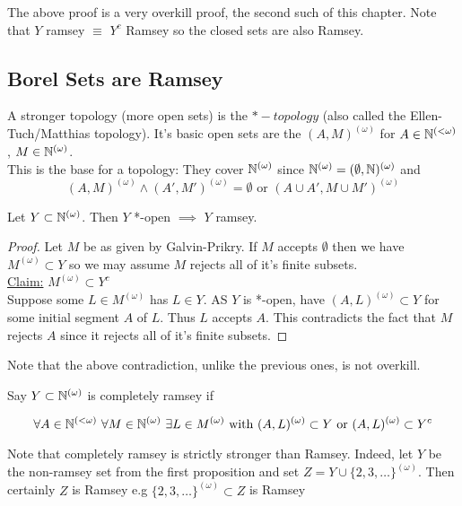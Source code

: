 \documentclass[a4paper]{article}
\newcommand{\Nomega}{\N^{(\omega)}}
\newcommand{\Momega}{M^{(\omega)}}
\newcommand{\Nfinite}{\N^{(< \omega)}}
\begin{document}
  The above proof is a very overkill proof, the second such of this chapter.
  Note that $Y$ ramsey $\equiv$ $Y^c$ Ramsey so the closed sets are also Ramsey.
  \subsection{Borel Sets are Ramsey}
  A stronger topology (more open sets) is the $*-topology$ (also called the
  Ellen-Tuch/Matthias topology). It's basic open sets are the $(A,
  M)^{(\omega)}$ for $A \in \Nfinite$, $M \in \Nomega$.\\
  This is the base for a topology: They cover $\Nomega$ since $\Nomega =
  (\emptyset, \N)^{(\omega)}$ and
  \[(A, M)^{(\omega)} \wedge (A', M')^{(\omega)} = \emptyset \text{ or } (A \cup
    A', M \cup M')^{(\omega)}\]
  \begin{thm}
    Let $Y \subset \Nomega$. Then $Y$ *-open $\implies$ $Y$ ramsey.
  \end{thm}
  \begin{proof}
    Let $M$ be as given by Galvin-Prikry. If $M$ accepts $\emptyset$ then we
    have $\Momega \subset Y$ so we may assume $M$ rejects all of it's finite
    subsets.\\
    \underline{Claim:} $\Momega \subset Y^c$\\
    Suppose some $L \in \Momega$ has $L \in Y$. AS $Y$ is *-open, have
    $(A,L)^{(\omega)} \subset Y$ for some initial segment $A$ of $L$. Thus $L$
    accepts $A$. This contradicts the fact that $M$ rejects $A$ since it rejects
    all of it's finite subsets.
  \end{proof}
  Note that the above contradiction, unlike the previous ones, is not
  overkill.\\
  \begin{defi}
    Say $Y \subset \Nomega$ is completely ramsey if

    \[\forall A \in \Nfinite \ \forall M \in \Nomega \ \exists L \in \Momega \text{ with
      } (A,L)^{(\omega)} \subset Y \text{ or } (A,L)^{(\omega)} \subset Y^c\]
  \end{defi}
  Note that completely ramsey is strictly stronger than Ramsey. Indeed, let $Y$
  be the non-ramsey set from the first proposition and set $Z = Y \cup
  \{2,3,\dots\}^{(\omega)}$. Then certainly $Z$ is Ramsey e.g $\{2,3,\dots
  \}^{(\omega)} \subset Z$ is Ramsey
  \printindex
\end{document}

